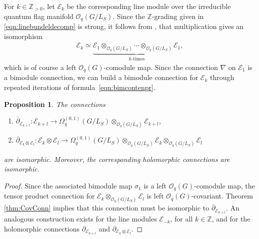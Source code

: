 \documentclass[10pt,a4paper]{amsart}
\numberwithin{equation}{section}
\newtheorem{prop}[Theorem]{Proposition}
 { \theoremstyle{definition}
\newtheorem{defn}[Theorem]{Definition}
\newtheorem{Note}[Theorem]{Note}
\newtheorem{eg}[Theorem]{Example}
\newtheorem{Remark}[Theorem]{Remark} }
\newcommand\del{\partial}
\newcommand\adel{\overline{\partial}}
\begin{document}
For $k \in \mathbb{Z}_{>0}$, let $\mathcal{E}_k$ be the corresponding line module over the irreducible quantum flag manifold $\mathcal{O}_q(G/L_S)$. Since the \mbox{$\mathbb{Z}$-grading} given in \eqref{eqn:linebundeldecomp} is strong, it follows from \cite[Corollary 3.1]{FreddyO}, that multiplication gives an isomorphism
\begin{align*}
\mathcal{E}_k \simeq \underbrace{\mathcal{E}_1 \otimes_{\mathcal{O}_q(G/L_S)} \cdots \otimes_{\mathcal{O}_q(G/L_S)} \mathcal{E}_1}_{k\text{-times}},
\end{align*}
which is of course a left $\mathcal{O}_q(G)$-comodule map. Since the connection $\nabla$ on $\mathcal{E}_1$ is a bimodule connection, we can build a bimodule connection for $\mathcal{E}_k$ through repeated iterations of formula~\eqref{eqn:bimcontenpr}.

\begin{prop}The connections
\begin{enumerate}\itemsep=0pt
\item[$(1)$] $\adel_{\mathcal{E}_{k + l}}\colon \mathcal{E}_{k + l} \to \Omega^{(0,1)}_q(G/L_S) \otimes_{\mathcal{O}_q(G/L_S)} \mathcal{E}_{k +l}$,
\item[$(2)$] $\adel_{\mathcal{E}_{k} \otimes \mathcal{E}_l}\colon \mathcal{E}_k \otimes \mathcal{E}_l \to \Omega^{(0,1)}_q(G/L_S) \otimes_{\mathcal{O}_q(G/L_S)} \mathcal{E}_k \otimes_{\mathcal{O}_q(G/L_S)} \mathcal{E}_l$
\end{enumerate}
are isomorphic. Moreover, the corresponding holomorphic connections are isomorphic.
\end{prop}
\begin{proof}Since the associated bimodule map $\sigma_1$ is a left $\mathcal{O}_q(G)$-comodule map, the tensor product connection for $\mathcal{E}_k \otimes_{\mathcal{O}_q(G/L_S)} \mathcal{E}_l$ is left $\mathcal{O}_q(G)$-covariant. Theorem \ref{thm:CovConn} implies that this connection must be isomorphic to $\adel_{\mathcal{E}_{k+l}}$. An analogous construction exists for the line modules $\mathcal{E}_{-k}$, for all $k \in \mathbb{Z}$, and for the holomorphic connections $\del_{\mathcal{E}_{k+l}}$ and $\del_{\mathcal{E}_{k} \otimes \mathcal{E}_l}$.
\end{proof}
\end{document}
